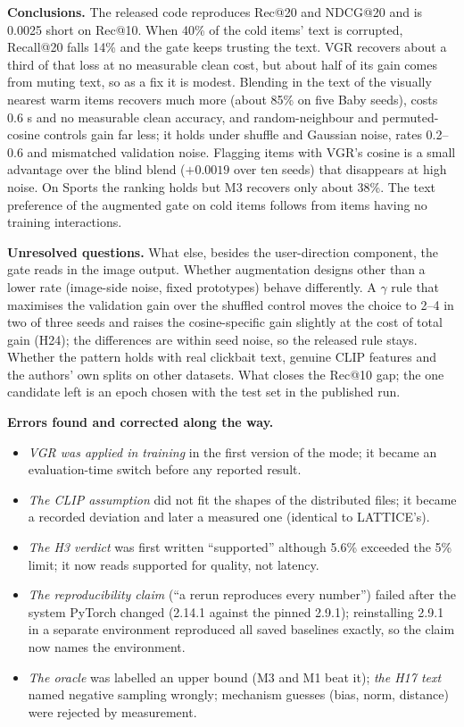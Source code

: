 \documentclass[conference]{IEEEtran}
\newcommand{\code}[1]{\texttt{\detokenize{#1}}}
\begin{document}
\textbf{Conclusions.} The released code reproduces Rec@20 and NDCG@20 and is 0.0025 short on Rec@10. When 40\% of the cold items' text is corrupted, Recall@20 falls 14\% and the gate keeps trusting the text. VGR recovers about a third of that loss at no measurable clean cost, but about half of its gain comes from muting text, so as a fix it is modest. Blending in the text of the visually nearest warm items recovers much more (about 85\% on five Baby seeds), costs 0.6 s and no measurable clean accuracy, and random-neighbour and permuted-cosine controls gain far less; it holds under shuffle and Gaussian noise, rates 0.2--0.6 and mismatched validation noise. Flagging items with VGR's cosine is a small advantage over the blind blend ($+0.0019$ over ten seeds) that disappears at high noise. On Sports the ranking holds but M3 recovers only about 38\%. The text preference of the augmented gate on cold items follows from items having no training interactions.

\textbf{Unresolved questions.} What else, besides the user-direction component, the gate reads in the image output. Whether augmentation designs other than a lower rate (image-side noise, fixed prototypes) behave differently. A $\gamma$ rule that maximises the validation gain over the shuffled control moves the choice to 2--4 in two of three seeds and raises the cosine-specific gain slightly at the cost of total gain (H24); the differences are within seed noise, so the released rule stays. Whether the pattern holds with real clickbait text, genuine CLIP features and the authors' own splits on other datasets. What closes the Rec@10 gap; the one candidate left is an epoch chosen with the test set in the published run.

\textbf{Errors found and corrected along the way.}
\begin{itemize}
\item \emph{VGR was applied in training} in the first version of the \code{improved} mode; it became an evaluation-time switch before any reported result.
\item \emph{The CLIP assumption} did not fit the shapes of the distributed files; it became a recorded deviation and later a measured one (identical to LATTICE's).
\item \emph{The H3 verdict} was first written ``supported'' although 5.6\% exceeded the 5\% limit; it now reads supported for quality, not latency.
\item \emph{The reproducibility claim} (``a rerun reproduces every number'') failed after the system PyTorch changed (2.14.1 against the pinned 2.9.1); reinstalling 2.9.1 in a separate environment reproduced all saved baselines exactly, so the claim now names the environment.
\item \emph{The oracle} was labelled an upper bound (M3 and M1 beat it); \emph{the H17 text} named negative sampling wrongly; mechanism guesses (bias, norm, distance) were rejected by measurement.
\end{itemize}
\end{document}
